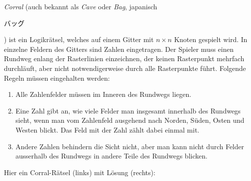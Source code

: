 {\em Corral} (auch bekannt als {\em Cave} oder {\em Bag}, japanisch
\begin{CJK}{UTF8}{min}バッグ\end{CJK})
ist ein Logikrätsel, welches auf einem Gitter mit $n\times n$
Knoten gespielt wird.
In einzelne Feldern des Gitters sind Zahlen eingetragen.
Der Spieler muss einen Rundweg enlang der Rasterlinien einzeichnen, der keinen
Rasterpunkt mehrfach durchläuft, aber nicht notwendigerweise durch alle
Rasterpunkte führt.
Folgende Regeln müssen eingehalten werden:
\begin{enumerate}
\item
Alle Zahlenfelder müssen im Inneren des Rundwegs liegen.
\item
Eine Zahl gibt an, wie viele Felder man insgesamt innerhalb des
Rundwegs sieht, wenn man vom Zahlenfeld ausgehend nach Norden,
Süden, Osten und Westen blickt.
Das Feld mit der Zahl zählt dabei einmal mit.
\item
Andere Zahlen behindern die Sicht nicht, aber man kann nicht durch
Felder ausserhalb des Rundwegs in andere Teile des Rundwegs blicken.
\end{enumerate}
Hier ein Corral-Rätsel (links) mit Lösung (rechts):
